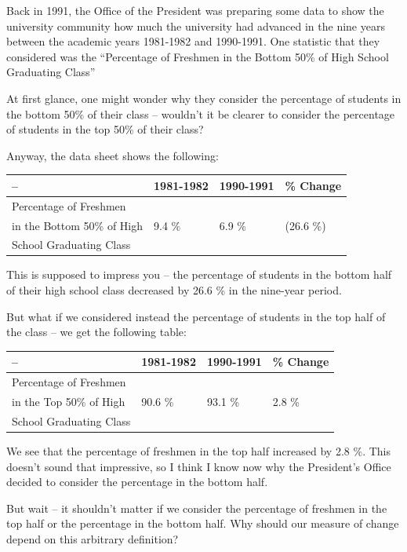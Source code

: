\documentclass[
]{book}
\begin{document}
Back in 1991, the Office of the President was preparing some data to show the university community how much the university had advanced in the nine years between the academic years 1981-1982 and 1990-1991. One statistic that they considered was the
``Percentage of Freshmen in the Bottom 50\% of High School Graduating Class''

At first glance, one might wonder why they consider the percentage of students in the bottom 50\% of their class -- wouldn't it be clearer to consider the percentage of students in the top 50\% of their class?

Anyway, the data sheet shows the following:

\begin{longtable}[]{@{}llll@{}}
\toprule
-- & 1981-1982 & 1990-1991 & \% Change \\
\midrule
\endhead
Percentage of Freshmen & & & \\
in the Bottom 50\% of High & 9.4 \% & 6.9 \% & (26.6 \%) \\
School Graduating Class & & & \\
\bottomrule
\end{longtable}

This is supposed to impress you -- the percentage of students in the bottom half of their high school class decreased by 26.6 \% in the nine-year period.

But what if we considered instead the percentage of students in the top half of the class -- we get the following table:

\begin{longtable}[]{@{}llll@{}}
\toprule
-- & 1981-1982 & 1990-1991 & \% Change \\
\midrule
\endhead
Percentage of Freshmen & & & \\
in the Top 50\% of High & 90.6 \% & 93.1 \% & 2.8 \% \\
School Graduating Class & & & \\
\bottomrule
\end{longtable}

We see that the percentage of freshmen in the top half increased by 2.8 \%. This doesn't sound that impressive, so I think I know now why the President's Office decided to consider the percentage in the bottom half.

But wait -- it shouldn't matter if we consider the percentage of freshmen in the top half or the percentage in the bottom half. Why should our measure of change depend on this arbitrary definition?
\end{document}
